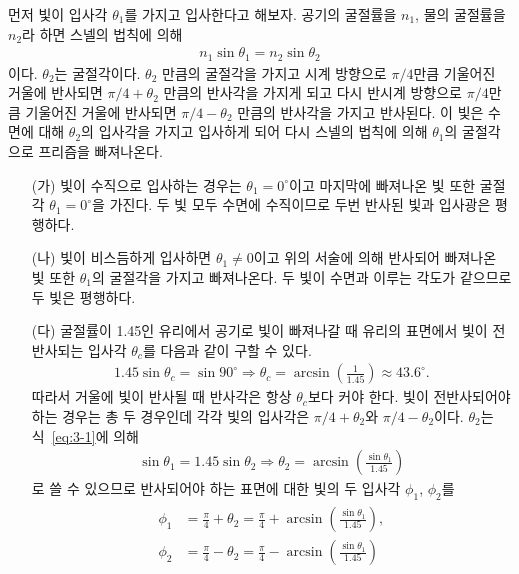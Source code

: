 \documentclass[tightenlines,floatfix,nofootinbib,superscriptaddress,fleqn]{revtex4-2}
\begin{document}
먼저 빛이 입사각 $\theta_1$를 가지고 입사한다고 해보자. 공기의 굴절률을 $n_1$,
물의 굴절률을 $n_2$라 하면 스넬의 법칙에 의해
\begin{align}\label{eq:3-1}
  n_1\sin\theta_1 = n_2\sin\theta_2
\end{align}
이다. $\theta_2$는 굴절각이다. $\theta_2$ 만큼의 굴절각을 가지고 
시계 방향으로 $\pi/4$만큼 기울어진 거울에 반사되면 $\pi/4+\theta_2$ 만큼의 반사각을
가지게 되고 다시 반시계 방향으로 $\pi/4$만큼 기울어진 거울에 반사되면 $\pi/4-\theta_2$
만큼의 반사각을 가지고 반사된다. 이 빛은 수면에 대해 $\theta_2$의 입사각을 가지고
입사하게 되어 다시 스넬의 법칙에 의해 $\theta_1$의 굴절각으로 프리즘을 빠져나온다.
\begin{itemize}
  \item[(가)]
  빛이 수직으로 입사하는 경우는 $\theta_1=0^\circ$이고 마지막에 빠져나온 빛 또한 굴절각
  $\theta_1=0^\circ$을 가진다. 두 빛 모두 수면에 수직이므로 두번 반사된 빛과 입사광은
  평행하다.
  \item[(나)]
  빛이 비스듬하게 입사하면 $\theta_1\neq 0$이고 위의 서술에 의해 반사되어 빠져나온 빛 또한
  $\theta_1$의 굴절각을 가지고 빠져나온다. 두 빛이 수면과 이루는 각도가 같으므로 두 빛은
  평행하다.
  \item[(다)] 
  굴절률이 1.45인 유리에서 공기로 빛이 빠져나갈 때 유리의 표면에서 빛이 전반사되는
  입사각 $\theta_c$를 다음과 같이 구할 수 있다.
  \begin{align}
    1.45\sin\theta_c = \sin90^\circ\Longrightarrow
    \theta_c = \arcsin\left(\frac{1}{1.45}\right)\approx 43.6^\circ.
  \end{align}
  따라서 거울에 빛이 반사될 때 반사각은 항상 $\theta_c$보다 커야 한다.
  빛이 전반사되어야 하는 경우는 총 두 경우인데 각각 빛의 입사각은 
  $\pi/4+\theta_2$와 $\pi/4-\theta_2$이다. $\theta_2$는 식~\eqref{eq:3-1}에 의해
  \begin{align}
    \sin\theta_1 = 1.45\sin\theta_2\Longrightarrow
    \theta_2 = \arcsin\left(\frac{\sin\theta_1}{1.45}\right)
  \end{align}
  로 쓸 수 있으므로 반사되어야 하는 표면에 대한 빛의 두 입사각 $\phi_1$, $\phi_2$를
  \begin{align}
    \begin{split}
      \phi_1 &= \frac{\pi}{4}+\theta_2 = \frac{\pi}{4}
      +\arcsin\left(\frac{\sin\theta_1}{1.45}\right), \\
      \phi_2 &= \frac{\pi}{4}-\theta_2 = \frac{\pi}{4}
      -\arcsin\left(\frac{\sin\theta_1}{1.45}\right)
    \end{split}

\end{align}
\end{itemize}
\end{document}
